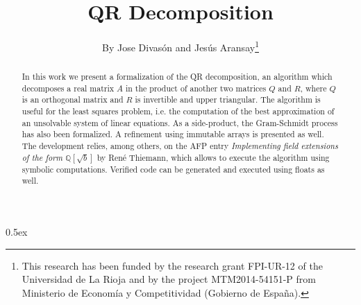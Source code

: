 \documentclass[11pt,a4paper]{article}
\begin{document}
\title{QR Decomposition}
\author{By Jose Divas\'on and Jes\'us Aransay\thanks{This research has been funded 
  by the research grant FPI-UR-12 of the Universidad de La Rioja and by the project MTM2014-54151-P from Ministerio de Econom\'ia y Competitividad
(Gobierno de Espa\~na).}}
\maketitle


\begin{abstract}
In this work we present a formalization of the QR decomposition, an algorithm which decomposes
a real matrix $A$ in the product of another two matrices $Q$ and $R$, where $Q$ is an orthogonal matrix
and $R$ is invertible and upper triangular. The algorithm is useful for the least squares problem, 
i.e. the computation of the best approximation of an unsolvable system of linear equations. 
As a side-product, the Gram-Schmidt process has also been formalized. A refinement using immutable arrays is presented as well. 
The development relies, among others, on the AFP entry \emph{Implementing field extensions of the form $\mathbb{Q}[\sqrt{b}]$} by Ren\'e Thiemann,
which allows to execute the algorithm using symbolic computations. Verified code can be generated and executed using floats as well.

\end{abstract}

\tableofcontents

\parindent 0pt\parskip 0.5ex


\end{document}
